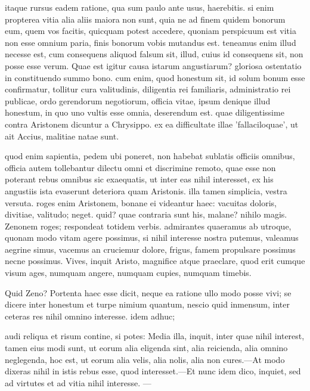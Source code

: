  itaque rursus eadem ratione, qua sum paulo ante usus, haerebitis. si enim propterea vitia alia aliis maiora non sunt, quia ne ad finem quidem bonorum eum, quem vos facitis, quicquam potest accedere, quoniam perspicuum est vitia non esse omnium paria, finis bonorum vobis mutandus est. teneamus enim illud necesse est, cum consequens aliquod falsum sit, illud, cuius id consequens sit, non posse esse verum. Quae est igitur causa istarum angustiarum? gloriosa ostentatio in constituendo summo bono. cum enim, quod honestum sit, id solum bonum esse confirmatur, tollitur cura valitudinis, diligentia rei familiaris, administratio rei publicae, ordo gerendorum negotiorum, officia vitae, ipsum denique illud honestum, in quo uno vultis esse omnia, deserendum est. quae diligentissime contra Aristonem dicuntur a Chrysippo. ex ea difficultate illae 'fallaciloquae', ut ait Accius, malitiae natae sunt.

 quod enim sapientia, pedem ubi poneret, non habebat sublatis officiis omnibus, officia autem tollebantur dilectu omni et discrimine remoto, quae esse non poterant rebus omnibus sic exaequatis, ut inter eas nihil interesset, ex his angustiis ista evaserunt deteriora quam Aristonis. illa tamen simplicia, vestra versuta. roges enim Aristonem, bonane ei videantur haec: vacuitas doloris, divitiae, valitudo; neget. quid? quae contraria sunt his, malane? nihilo magis. Zenonem roges; respondeat totidem verbis. admirantes quaeramus ab utroque, quonam modo vitam agere possimus, si nihil interesse nostra putemus, valeamus aegrine simus, vacemus an cruciemur dolore, frigus, famem propulsare possimus necne possimus. Vives, inquit Aristo, magnifice atque praeclare, quod erit cumque visum ages, numquam angere, numquam cupies, numquam timebis.

 Quid Zeno? Portenta haec esse dicit, neque ea ratione ullo modo posse vivi; se dicere inter honestum et turpe nimium quantum, nescio quid inmensum, inter ceteras res nihil omnino interesse. idem adhuc;

 audi reliqua et risum contine, si potes: Media illa, inquit, inter quae nihil interest, tamen eius modi sunt, ut eorum alia eligenda sint, alia reicienda, alia omnino neglegenda, hoc est, ut eorum alia velis, alia nolis, alia non cures.—At modo dixeras nihil in istis rebus esse, quod interesset.—Et nunc idem dico, inquiet, sed ad virtutes et ad vitia nihil interesse. —

